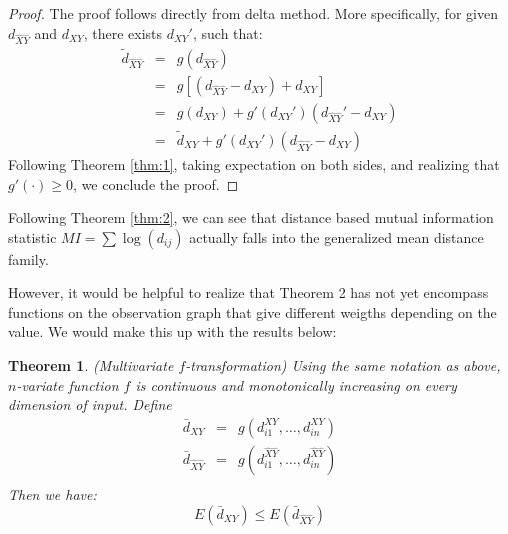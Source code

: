 \documentclass[12pt,letterpaper]{article}
\newtheorem{thm}{Theorem}
\begin{document}
\begin{proof}
  The proof follows directly from delta method. More specifically, for
  given $d_{\hat{X}\hat{Y}}$ and $d_{XY}$, there exists $d_{XY}'$, such that: 
  \begin{eqnarray*}
    \tilde{d}_{\hat{X}\hat{Y}} &=& g(d_{\hat{X}\hat{Y}})\\
                               &=& g
                                   \left[
                                   (d_{\hat{X}\hat{Y}} - d_{XY}) + d_{XY}
                                   \right] \\
                               &=& g(d_{XY}) + g'(d_{XY}') (d_{\hat{X}\hat{Y}}' - d_{XY})\\
                               &=& \tilde{d}_{XY} + g'(d_{XY}') (d_{\hat{X}\hat{Y}} - d_{XY})
  \end{eqnarray*}
  Following Theorem \ref{thm:1}, taking expectation on both sides, and
  realizing that $g'(\cdot) \ge 0$, we conclude the proof.
\end{proof}

Following Theorem \ref{thm:2}, we can see that distance based mutual
information statistic $MI = \sum \log(d_{ij})$ actually falls into the
generalized mean distance family.

However, it would be helpful to realize that Theorem 2 has not yet
encompass functions on the observation graph that give different
weigths depending on the value. We would make this up with the results below: 

\begin{thm}
  \label{thm:3}
  (Multivariate $f$-transformation) Using the same notation as above,
  $n$-variate function $f$ is continuous and monotonically increasing
  on every dimension of input. Define 
  \begin{eqnarray*}
    \bar{d}_{XY} &=& g(d^{XY}_{i1},\ldots,d^{XY}_{in})\\ 
    \bar{d}_{\hat{X}\hat{Y}} &=& g(d^{\hat{X}\hat{Y}}_{i1},\ldots,d^{\hat{X}\hat{Y}}_{in})\\
  \end{eqnarray*}
  Then we have:
  \begin{displaymath}
    E(\bar{d}_{XY}) \le{} E(\bar{d}_{\hat{X}\hat{Y}})
  \end{displaymath}
\end{thm}




\end{document}
